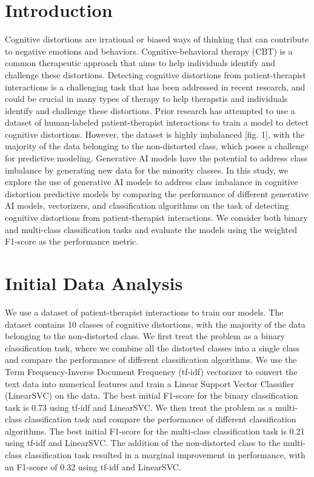 \documentclass[a0,landscape]{a0poster}
\begin{document}
\begin{multicols}{4}
\color{Black}

\color{Teal}

\section*{Introduction}
\color{Black}

Cognitive distortions are irrational or biased ways of thinking that can contribute to negative emotions and behaviors. Cognitive-behavioral therapy (CBT) is a common therapeutic approach that aims to help individuals identify and challenge these distortions. Detecting cognitive distortions from patient-therapist interactions is a challenging task that has been addressed in recent research, and could be crucial in many types of therapy to help therapstis and individuals identify and challenge these distortions. Prior research has attempted to use a dataset of human-labeled patient-therapist interactions to train a model to detect cognitive distortions\cite{original_paper}. However, the dataset is highly imbalanced [fig. 1], with the majority of the data belonging to the non-distorted class, which poses a challenge for predictive modeling. Generative AI models have the potential to address class imbalance by generating new data for the minority classes. In this study, we explore the use of generative AI models to address class imbalance in cognitive distortion predictive models by comparing the performance of different generative AI models, vectorizers, and classification algorithms on the task of detecting cognitive distortions from patient-therapist interactions. We consider both binary and multi-class classification tasks and evaluate the models using the weighted F1-score as the performance metric.

\color{Teal}
\section*{Initial Data Analysis}
\color{Black}

We use a dataset of patient-therapist interactions to train our models. The dataset contains 10 classes of cognitive distortions, with the majority of the data belonging to the non-distorted class. We first treat the problem as a binary classification task, where we combine all the distorted classes into a single class and compare the performance of different classification algorithms. We use the Term Frequency-Inverse Document Frequency (tf-idf) vectorizer to convert the text data into numerical features and train a Linear Support Vector Classifier (LinearSVC) on the data. The best initial F1-score for the binary classification task is 0.73 using tf-idf and LinearSVC. We then treat the problem as a multi-class classification task and compare the performance of different classification algorithms. The best initial F1-score for the multi-class classification task is 0.21 using tf-idf and LinearSVC. The addition of the non-distorted class to the multi-class classification task resulted in a marginal improvement in performance, with an F1-score of 0.32 using tf-idf and LinearSVC.



\end{multicols}
\end{document}
